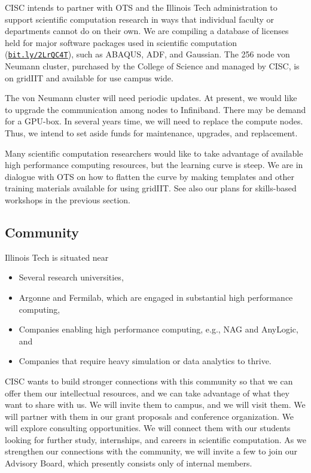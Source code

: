 \documentclass[12pt]{amsart}
\begin{document}
CISC intends to partner with OTS and the Illinois Tech administration to support scientific computation research in ways that individual faculty or departments cannot do on their own.  We are compiling a database of licenses held for major software packages used in scientific computation (\href{http://bit.ly/2LrQC4T}{\nolinkurl{bit.ly/2LrQC4T}}),  such as ABAQUS, ADF, and Gaussian.  The 256 node von Neumann cluster, purchased by the College of Science and managed by CISC, is on gridIIT and available for use campus wide.  

The von Neumann cluster will need periodic updates.  At present, we would like to upgrade the communication among nodes to Infiniband.  There may be demand for a GPU-box.  In several years time, we will need to replace the compute nodes.  Thus, we intend to set aside funds for maintenance, upgrades, and replacement.

Many scientific computation researchers would like to take advantage of available high performance computing resources, but the learning curve is steep.  We are in dialogue with OTS on how to flatten the curve by making templates and other training materials available for using gridIIT. See also our plans for skills-based workshops in the previous section.

\subsection*{Community} Illinois Tech is situated near 
\begin{itemize}
    \item Several research universities,
    
    \item Argonne and Fermilab, which are engaged in substantial high performance computing,
    
    \item Companies enabling high performance computing, e.g., NAG and AnyLogic,  and
    
    \item Companies that require heavy simulation or data analytics to thrive.
\end{itemize}
CISC wants to build stronger connections with this community so that we can offer them our intellectual resources, and we can take advantage of what they want to share with us.  We will invite them to campus, and we will visit them.  We will partner with them in our grant proposals and conference organization.  We will explore consulting opportunities.  We will connect them with our students looking for further study, internships, and careers in scientific computation.
As we strengthen our connections with the community, we will invite a few to join our Advisory Board, which presently consists only of internal members.
\end{document}
